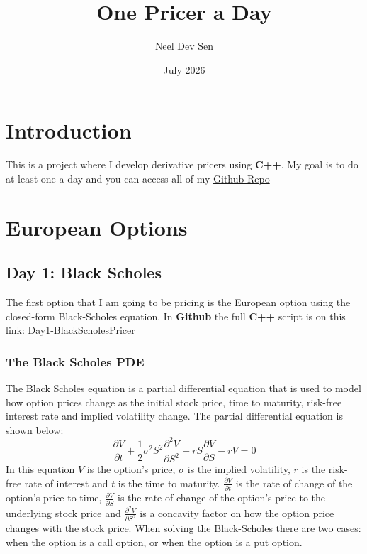 \documentclass[12pt]{article}
\title{One Pricer a Day}
\author{Neel Dev Sen}
\date{July 2026}
\numberwithin{equation}{section}
\begin{document}
	
	\maketitle
	\newpage
	\tableofcontents
	\newpage

\section{Introduction}
This is a project where I develop derivative pricers using \textbf{C++}. My goal is to do at least one a day and you can access all of my \href{https://github.com/neeldevsen/one-pricer-a-day}{Github Repo}
\newpage
\section{European Options}
\subsection{Day 1: Black Scholes}
The first option that I am going to be pricing is the European option using the closed-form Black-Scholes equation. \newline \newline In \textbf{Github} the full \textbf{C++} script is on this link:
\href{https://github.com/neeldevsen/one-pricer-a-day/blob/main/day1-BlackScholes.cpp}{Day1-BlackScholesPricer}
\subsubsection{The Black Scholes PDE}
  The Black Scholes equation is a partial differential equation that is used to model how option prices change as the initial stock price, time to maturity, risk-free interest rate and implied volatility change. The partial differential equation is shown below:
  \begin{equation} 
  	\frac{\partial V}{\partial t} + \frac{1}{2} \sigma^2 S^2 \frac{\partial^2 V}{\partial S^2} + rS\frac{\partial V}{\partial S} - rV = 0
 \end{equation} \newline
 In this equation $V$ is the option's price, $\sigma$ is the implied volatility, $r$ is the risk-free rate of interest and $t$ is the time to maturity. \newline \newline $\frac{\partial V}{\partial t} $ is the rate of change of the option's price to time, $\frac{\partial V}{\partial S}$ is the rate of change of the option's price to the underlying stock price and  $\frac{\partial^2 V}{\partial S^2}$ is a concavity factor on how the option price changes with the stock price.  When solving the Black-Scholes there are two cases: when the option is a call option, or when the option is a put option.
 \newpage
\end{document}
